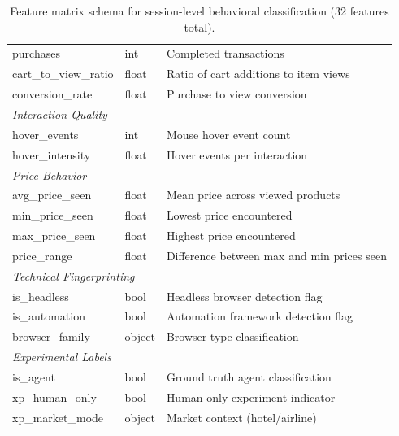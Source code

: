 \begin{table}[ht]
{\begin{tabular}{p{4.5cm}p{1.5cm}p{6cm}}
purchases & int & Completed transactions \\
cart\_to\_view\_ratio & float & Ratio of cart additions to item views \\
conversion\_rate & float & Purchase to view conversion \\
\hline
\multicolumn{3}{l}{\textit{Interaction Quality}} \\
hover\_events & int & Mouse hover event count \\
hover\_intensity & float & Hover events per interaction \\
\hline
\multicolumn{3}{l}{\textit{Price Behavior}} \\
avg\_price\_seen & float & Mean price across viewed products \\
min\_price\_seen & float & Lowest price encountered \\
max\_price\_seen & float & Highest price encountered \\
price\_range & float & Difference between max and min prices seen \\
\hline
\multicolumn{3}{l}{\textit{Technical Fingerprinting}} \\
is\_headless & bool & Headless browser detection flag \\
is\_automation & bool & Automation framework detection flag \\
browser\_family & object & Browser type classification \\
\hline
\multicolumn{3}{l}{\textit{Experimental Labels}} \\
is\_agent & bool & Ground truth agent classification \\
xp\_human\_only & bool & Human-only experiment indicator \\
xp\_market\_mode & object & Market context (hotel/airline) \\
\hline
\end{tabular}%
}
\caption{Feature matrix schema for session-level behavioral classification (32 features total).}
\label{tab:features}
\end{table}
